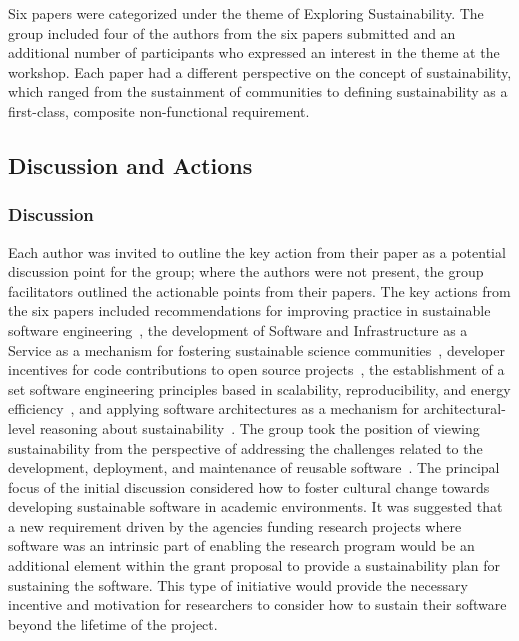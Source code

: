 \documentclass[11pt, oneside]{amsart}
\newcommand{\note}[1]{ {\textcolor{blueish}    { ***Note:      #1 }}}
\begin{document}

Six papers were categorized under the theme of Exploring Sustainability. The
group included four of the authors from the six papers submitted and an
additional number of participants who expressed an interest in the theme at the
workshop. Each paper had a different perspective on the concept of
sustainability, which ranged from the sustainment of communities to defining
sustainability as a first-class, composite non-functional requirement.
\subsection{Discussion and Actions}
\subsubsection{Discussion}

Each author was invited to outline the key action from their paper as a
potential discussion point for the group; where the authors were not present,
the group facilitators outlined the actionable points from their papers. The key
actions from the six papers included recommendations for improving practice in
sustainable software engineering~\cite{wssspe2_rosada_de_souza, wssspe2_downs},
the development of Software and Infrastructure as a Service as a mechanism for
fostering sustainable science communities~\cite{wssspe2_patra}, developer
incentives for code contributions to open source projects~\cite{wssspe2_pierce},
the establishment of a set software engineering principles based in scalability,
reproducibility, and energy efficiency~\cite{wssspe2_shi}, and applying software
architectures as a mechanism for architectural-level reasoning about
sustainability~\cite{wssspe2_venters}. The group took the position of viewing
sustainability from the perspective of addressing the challenges related to the
development, deployment, and maintenance of reusable
software~\cite{katzJORS2014}. The principal focus of the initial discussion
considered how to foster cultural change towards developing sustainable software
in academic environments. It was suggested that a new requirement driven by the
agencies funding research projects where software was an intrinsic part of
enabling the research program would be an additional element within the grant
proposal to provide a sustainability plan for sustaining the software. This type
of initiative would provide the necessary incentive and motivation for
researchers to consider how to sustain their software beyond the lifetime of the
project.
\end{document}
